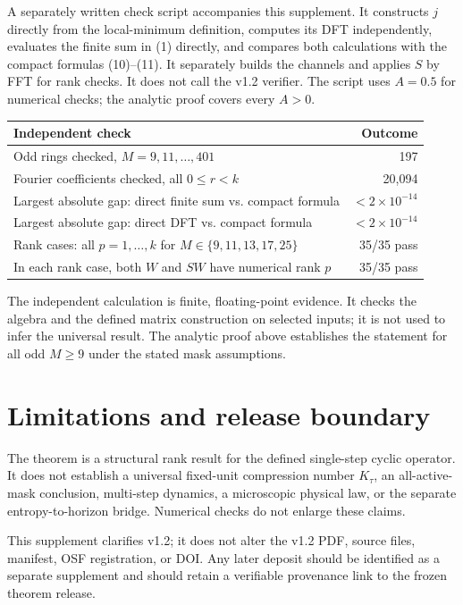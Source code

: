 \documentclass[11pt]{article}
\begin{document}
A separately written check script accompanies this supplement. It constructs $j$ directly from the local-minimum definition, computes its DFT independently, evaluates the finite sum in (1) directly, and compares both calculations with the compact formulas (10)--(11). It separately builds the channels and applies $S$ by FFT for rank checks. It does not call the v1.2 verifier. The script uses $A=0.5$ for numerical checks; the analytic proof covers every $A>0$.

\begin{center}
\begin{tabular}{@{}lr@{}}
\toprule
Independent check & Outcome \\
\midrule
Odd rings checked, $M=9,11,\ldots,401$ & 197 \\
Fourier coefficients checked, all $0\leq r<k$ & 20,094 \\
Largest absolute gap: direct finite sum vs. compact formula & $<2\times10^{-14}$ \\
Largest absolute gap: direct DFT vs. compact formula & $<2\times10^{-14}$ \\
Rank cases: all $p=1,\ldots,k$ for $M\in\{9,11,13,17,25\}$ & 35/35 pass \\
In each rank case, both $W$ and $SW$ have numerical rank $p$ & 35/35 pass \\
\bottomrule
\end{tabular}
\end{center}

The independent calculation is finite, floating-point evidence. It checks the algebra and the defined matrix construction on selected inputs; it is not used to infer the universal result. The analytic proof above establishes the statement for all odd $M\geq9$ under the stated mask assumptions.

\section{Limitations and release boundary}

The theorem is a structural rank result for the defined single-step cyclic operator. It does not establish a universal fixed-unit compression number $K_\tau$, an all-active-mask conclusion, multi-step dynamics, a microscopic physical law, or the separate entropy-to-horizon bridge. Numerical checks do not enlarge these claims.

This supplement clarifies v1.2; it does not alter the v1.2 PDF, source files, manifest, OSF registration, or DOI. Any later deposit should be identified as a separate supplement and should retain a verifiable provenance link to the frozen theorem release.
\end{document}
